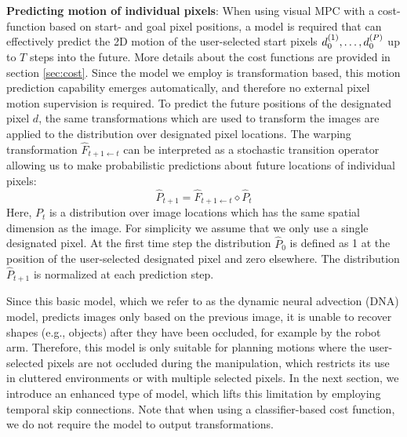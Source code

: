 \noindent \textbf{Predicting motion of individual pixels}: 
When using visual MPC with a cost-function based on start- and goal pixel positions, a model is required that can effectively predict the 2D motion of the user-selected start pixels $d_0^{(1)}, \dots, d_0^{(P)}$ up to $T$ steps into the future. More details about the cost functions are provided in section \ref{sec:cost}. Since the model we employ is transformation based, this motion prediction capability emerges automatically, and therefore no external pixel motion supervision is required. To predict the future positions of the designated pixel $d$, the same transformations which are used to transform the images are applied to the distribution over designated pixel locations. The warping transformation $\hat{F}_{t+1 \leftarrow t}$ can be interpreted as a stochastic transition operator allowing us to make probabilistic predictions about future locations of individual pixels:
\begin{equation}
\hat{P}_{t+1} = \hat{F}_{t+1 \leftarrow t} \diamond  \hat{P}_t
\label{eqn:prob_forward}
\end{equation}
Here, $P_t$ is a distribution over image locations which has the same spatial dimension as the image. For simplicity we assume that we only use a single designated pixel. At the first time step the distribution $\hat{P}_0$ is defined as 1 at the position of the user-selected designated pixel and zero elsewhere. The distribution $\hat{P}_{t+1}$ is normalized at each prediction step.

Since this basic model, which we refer to as the dynamic neural advection (DNA) model, predicts images only based on the previous image, it is unable to recover shapes (e.g., objects) after they have been occluded, for example by the robot arm. Therefore, this model is only suitable for planning motions where the user-selected pixels are not occluded during the manipulation, which restricts its use in cluttered environments or with multiple selected pixels. In the next section, we introduce an enhanced type of model, which lifts this limitation by employing temporal skip connections. Note that when using a classifier-based cost function, we do not require the model to output transformations. 

